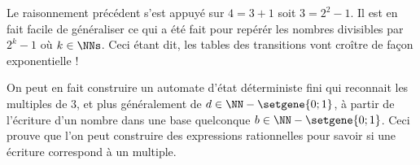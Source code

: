Le raisonnement précédent s'est appuyé sur $4 = 3 + 1$ soit $3 = 2^2 - 1$. Il est en fait facile de généraliser ce qui a été fait pour repérér les nombres divisibles par $2^k - 1$ où $k \in \NNs$.
Ceci étant dit, les tables des transitions vont croître de façon exponentielle !


\medskip


On peut en fait construire un automate d'état déterministe fini qui reconnait les multiples de $3$, et plus généralement de $d \in \NN - \setgene{0 ; 1}$, à partir de l'écriture d'un nombre dans une base quelconque $b \in \NN - \setgene{0 ; 1}$.
Ceci prouve que l'on peut construire des expressions rationnelles pour savoir si une écriture correspond à un multiple.